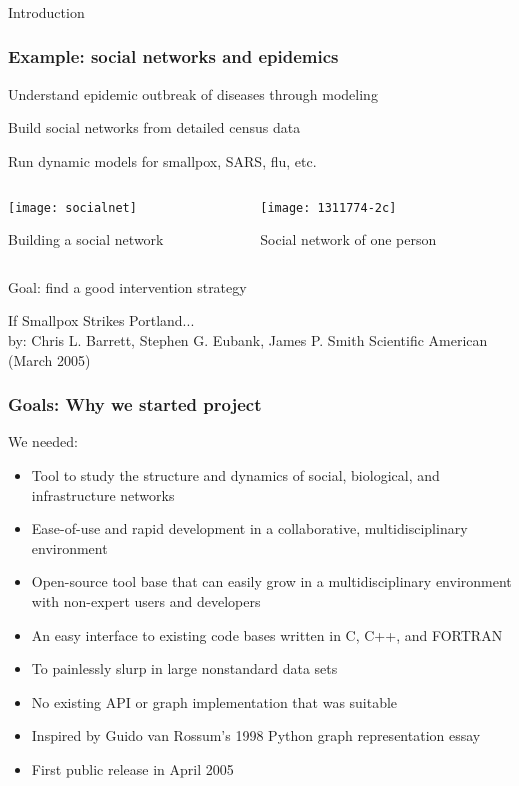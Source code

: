 \begin{frame}
\frametitle{}
\begin{center}
{\fontsize{49}{90}\selectfont
{\color{title} Introduction}}
\end{center}
\end{frame}


\begin{frame}
\frametitle{Example: social networks and epidemics}
Understand epidemic outbreak of diseases through modeling

Build social networks from detailed census data

Run dynamic models for smallpox, SARS, flu, etc.

\begin{columns}[c]
\begin{column}{0.65\textwidth}
\centerline{\texttt{[image: socialnet]}}
\centerline{\small Building a social network}
\end{column}
\begin{column}{0.35\textwidth}

\centerline{\texttt{[image: 1311774-2c]}}
\centerline{\small Social network of one person}
\end{column}
\end{columns}

Goal: find a good intervention strategy

\footnotesize
If Smallpox Strikes Portland...\\
by: Chris L. Barrett, Stephen G. Eubank, James P. Smith
Scientific American (March 2005)
\end{frame}




\begin{frame}
\frametitle{Goals: Why we started project}
\begin{block}
{We needed:}
\begin{itemize}
\item Tool to study the structure and
dynamics of social, biological, and infrastructure networks
\item Ease-of-use and rapid
development in a collaborative, multidisciplinary environment
\item Open-source tool base that can easily
grow in a multidisciplinary environment with non-expert users and developers
\item An easy interface to
existing code bases written in C, C++, and FORTRAN
\item To painlessly slurp in large nonstandard data sets
\end{itemize}
\end{block}
\begin{itemize}
\item No existing API or graph implementation that was suitable
\item Inspired by Guido van Rossum's 1998 Python graph representation essay
\item First public release in April 2005
\end{itemize}
\end{frame}





